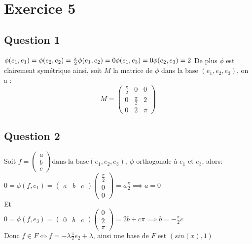 \documentclass[td4.tex]{subfiles}
\begin{document}
\section{Exercice 5}
\subsection{Question 1}
$
\phi(e_1,e_1) = \phi(e_2, e_2) = \frac{\pi}{2} \\
\phi(e_1,e_2) = 0 \\
\phi(e_1,e_3) = 0 \\
\phi(e_2,e_3) = 2
$
De plus $\phi$ est clairement symétrique ainsi, soit $M$ la matrice de $\phi$ dans la base $(e_1, e_2, e_3)$, on a :
$$ M =
\begin{pmatrix}
  \frac{\pi}{2} & 0 & 0 \\
  0 & \frac{\pi}{2} & 2 \\
  0 & 2 & \pi
\end{pmatrix}
$$

\subsection{Question 2}
Soit $f = \begin{pmatrix} a \\ b \\ c \end{pmatrix}\text{dans la base}(e_1,e_2,e_3),~\phi$ orthogonale à $e_1$ et $e_3$, alors:
$0 = \phi(f,e_1) = \begin{pmatrix}a & b & c\end{pmatrix}\begin{pmatrix} \frac{\pi}{2} \\ 0 \\ 0 \end{pmatrix} = a\frac{\pi}{2} \implies a = 0$\\
Et \\
$0 = \phi(f, e_3) = \begin{pmatrix}0 & b & c\end{pmatrix} \begin{pmatrix}0 \\ 2 \\ \pi \end{pmatrix} = 2b + c\pi \implies b = -\frac{\pi}{2}c$ \\
Donc $f \in F \iff f = -\lambda \frac{\pi}{2} e_2 + \lambda$, ainsi une base de $F$ est $(sin(x), 1)$
\end{document}
